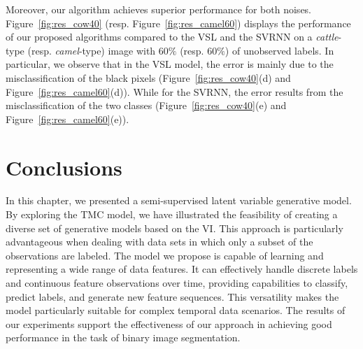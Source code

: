 Moreover, our algorithm achieves superior performance for both noises.
Figure~\ref{fig:res_cow40} (resp. Figure~\ref{fig:res_camel60}) 
displays the performance of our proposed algorithms compared to the
 VSL and the SVRNN on a \textit{cattle}-type (resp. \textit{camel}-type) 
 image with $60\%$ (resp.  $60\%$) of unobserved labels.
In particular, we observe that in the VSL model, 
the error is mainly due to the misclassification of the black pixels 
(Figure~\ref{fig:res_cow40}(d) 
and Figure~\ref{fig:res_camel60}(d)). 
While for the SVRNN, the error results from the misclassification 
of the two classes (Figure~\ref{fig:res_cow40}(e) 
and Figure~\ref{fig:res_camel60}(e)).




 

\newpage
\section{Conclusions}
\label{sec:conclusion}

In this chapter, we presented a semi-supervised latent variable generative model.
By exploring the TMC model, we have illustrated the
feasibility of creating a diverse set of generative models based
on the VI. This approach is particularly advantageous when dealing
with data sets in which only a subset of the observations are labeled. The model
we propose is capable of learning and representing a wide range of data features.
It can effectively handle discrete labels and continuous feature observations
over time, providing capabilities to classify, predict labels, and generate new
feature sequences. This versatility makes the model particularly suitable for
complex temporal data scenarios. The results of our experiments support the
effectiveness of our approach in achieving good performance in the
task of binary image segmentation.
